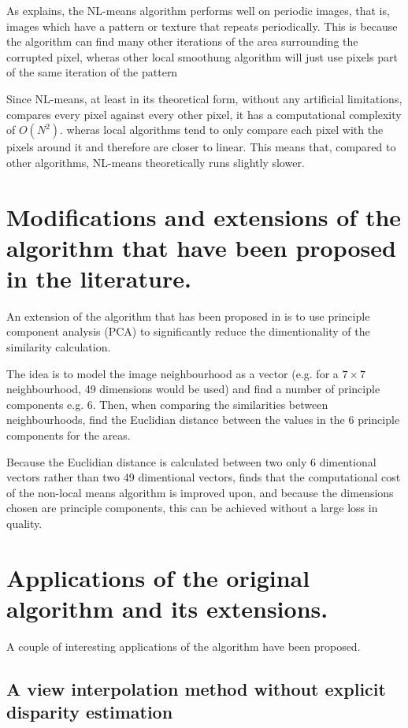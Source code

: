 \documentclass[11pt]{article}
\begin{document}
As \cite{Buades_2005} explains, the NL-means algorithm performs well on periodic images, that is, images which have a pattern or texture that repeats periodically. This is because the algorithm can find many other iterations of the area surrounding the corrupted pixel, wheras other local smoothung algorithm will just use pixels part of the same iteration of the pattern

Since NL-means, at least in its theoretical form, without any artificial limitations, compares every pixel against every other pixel, it has a computational complexity of $O(N^2)$. wheras local algorithms tend to only compare each pixel with the pixels around it and therefore are closer to linear. This means that, compared to other algorithms, NL-means theoretically runs slightly slower.

\section{Modifications and extensions of the algorithm that have been proposed in the literature.}

An extension of the algorithm that has been proposed in \cite{Tasdizen_2008} is to use principle component analysis (PCA) to significantly reduce the dimentionality of the similarity calculation.

The idea is to model the image neighbourhood as a vector (e.g. for a $7 \times 7$ neighbourhood, 49 dimensions would be used) and find a number of principle components e.g. 6. Then, when comparing the similarities between neighbourhoods, find the Euclidian distance between the values in the 6 principle components for the areas. 

Because the Euclidian distance is calculated between two only 6 dimentional vectors rather than two 49 dimentional vectors, \cite{Tasdizen_2008} finds that the computational cost of the non-local means algorithm is improved upon, and because the dimensions chosen are principle components, this can be achieved without a large loss in quality.

\section{Applications of the original algorithm and its extensions. }

A couple of interesting applications of the algorithm have been proposed. 

\subsection{A view interpolation method without explicit disparity estimation}
\end{document}
